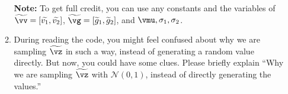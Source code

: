 \begin{Q}
\begin{enumerate}
\begin{enumerate}
    \textbf{Note:} To get full credit, you can use any constants and the variables of $\widetilde{\vv}=[\widetilde{v_1}, \widetilde{v_2}]$, $\widetilde{\vg}=[\widetilde{g}_1, \widetilde{g}_2]$, and $\vmu, \sigma_1, \sigma_2$.
    
    \item During reading the code, you might feel confused about why we are sampling $\widetilde{\vz}$ in such a way, instead of generating a random value directly. But now, you could have some clues. Please briefly explain ``Why we are sampling $\widetilde{\vz}$ with $\mathcal{N}(0, 1)$, instead of directly generating the values.''
\end{enumerate}

\end{enumerate}

\end{Q}